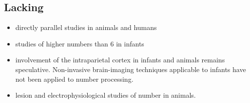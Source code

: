 \documentclass[12pt]{article}
\begin{document}
\subsection*{Lacking}
\begin{itemize}
\item directly parallel studies in animals and humans
\item studies of higher numbers than 6 in infants
\item  involvement of the intraparietal
cortex in infants and animals remains speculative.
Non-invasive brain-imaging techniques applicable to
infants have not been applied to number processing.
\item lesion and electrophysiological studies of
number in animals.
\end{itemize}
\end{document}
